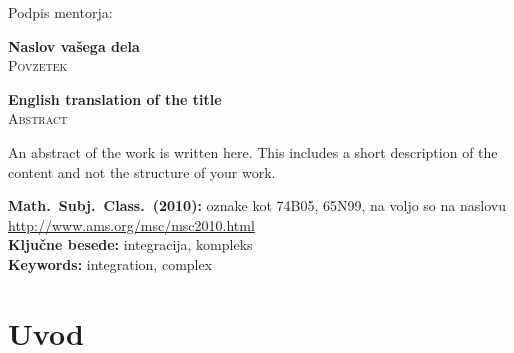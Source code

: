 \documentclass[12pt,a4paper,twoside]{article}
\newcommand{\naslovdela}{Naslov vašega dela}
\newcommand{\kljucnebesede}{integracija\sep kompleks} %
\newcommand{\keywords}{integration\sep complex} %
\newcommand{\sep}{, }  %
\theoremstyle{definition} %
\theoremstyle{plain} %
\numberwithin{equation}{section}  %
\begin{document}
\vspace{2cm}
\hspace*{\fill} Podpis mentorja: \phantom{prostor za podpis}


\cleardoublepage
{}

\begin{center}
\textbf{\naslovdela} \\[3mm]
\textsc{Povzetek} \\[2mm]
\end{center}




\vfill
\begin{center}
\textbf{English translation of the title} \\[3mm] %
\textsc{Abstract}\\[2mm]
\end{center}

An abstract of the work is written here. This includes a short description of
the content and not the structure of your work.

\vfill\noindent
\textbf{Math.~Subj.~Class.~(2010):} oznake kot 74B05, 65N99, na voljo so na naslovu
\url{http://www.ams.org/msc/msc2010.html} \\[1mm]
\textbf{Ključne besede:} \kljucnebesede \\[1mm]
\textbf{Keywords:} \keywords

\cleardoublepage

\setcounter{page}{1}    %

\section{Uvod}
\end{document}
